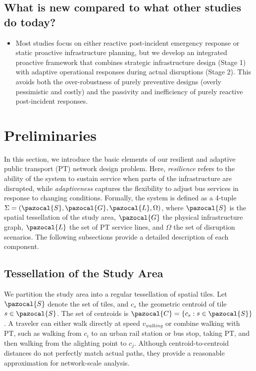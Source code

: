 \documentclass[3p,times,procedia]{elsarticle}
\begin{document}
\subsection{What is new compared to what other studies do today?}
\begin{itemize}
    \item Most studies focus on either reactive post-incident emergency response or static proactive infrastructure planning, but we develop an integrated proactive framework that combines strategic infrastructure design (Stage 1) with adaptive operational responses during actual disruptions (Stage 2).
This avoids both the over-robustness of purely preventive designs (overly pessimistic and costly) and the passivity and inefficiency of purely reactive post-incident responses.
\end{itemize}
\section{Preliminaries}
In this section, we introduce the basic elements of our resilient and adaptive public transport (PT) network design problem. 
Here, \emph{resilience} refers to the ability of the system to sustain service when parts of the infrastructure are disrupted, while \emph{adaptiveness} captures the flexibility to adjust bus services in response to changing conditions. 
%
Formally, the system is defined as a 4-tuple 
$\Sigma = (\pazocal{S}, \pazocal{G}, \pazocal{L}, \Omega)$,
where $\pazocal{S}$ is the spatial tessellation of the study area, $\pazocal{G}$ the physical infrastructure graph, $\pazocal{L}$ the set of PT service lines, and $\Omega$ the set of disruption scenarios. 
%
The following subsections provide a detailed description of each component.

\subsection{Tessellation of the Study Area}
We partition the study area into a regular tessellation of spatial tiles. Let $\pazocal{S}$ denote the set of tiles, and $c_s$ the geometric centroid of tile $s \in \pazocal{S}$. The set of centroids is $\pazocal{C} = \{c_s : s \in \pazocal{S}\}$. 
%
A traveler can either walk directly at speed $v_{walking}$ or combine walking with PT, such as walking from $c_i$ to an urban rail station or bus stop, taking PT, and then walking from the alighting point to $c_j$. Although centroid-to-centroid distances do not perfectly match actual paths, they provide a reasonable approximation for network-scale analysis.
\end{document}
